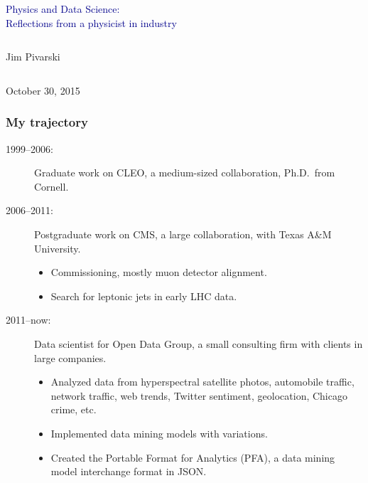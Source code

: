 \documentclass[compress]{beamer}
\begin{document}
\begin{frame}
\vfill
\begin{center}
\textcolor{darkblue}{\Large Physics and Data Science: \\\vspace{0.2 cm} Reflections from a physicist in industry}

\vfill
\begin{columns}
\begin{center}
\large
Jim Pivarski
\end{center}
\end{columns}


\vfill
October 30, 2015

\end{center}
\end{frame}

\small

\begin{frame}
\frametitle{My trajectory}
\begin{description}
\item[1999--2006:] Graduate work on CLEO, a medium-sized collaboration, Ph.D.\ from Cornell.
\item[2006--2011:] Postgraduate work on CMS, a large collaboration, with Texas A\&M University.
\begin{itemize}\setlength{\itemsep}{0.2 cm}
\item Commissioning, mostly muon detector alignment.
\item Search for leptonic jets in early LHC data.
\end{itemize}
\item[2011--now:] Data scientist for Open Data Group, a small consulting firm with clients in large companies.
\begin{itemize}\setlength{\itemsep}{0.2 cm}
\item Analyzed data from hyperspectral satellite photos, automobile traffic, network traffic, web trends, Twitter sentiment, geolocation, Chicago crime, etc.
\item Implemented data mining models with variations.
\item Created the Portable Format for Analytics (PFA), a data mining model interchange format in JSON.
\end{itemize}
\end{description}
\end{frame}
\end{document}
